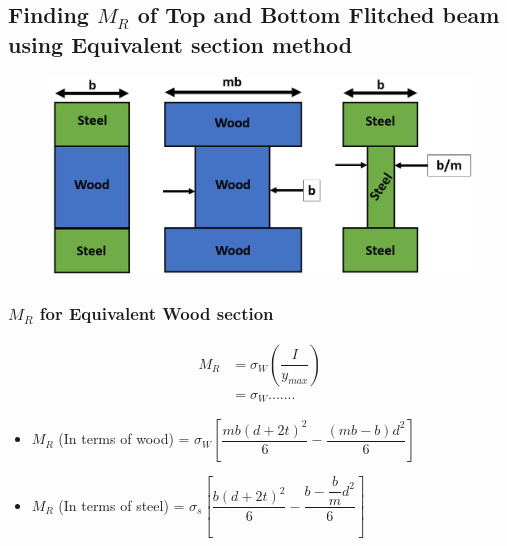 \documentclass[8pt]{report}
\begin{document}
	\subsection{Finding $M_R$ of Top and Bottom Flitched beam using Equivalent section method}
		\begin{figure}[H]
			\centering
			\includegraphics[scale=0.4]{flitchedbeam_MR.png}
		\end{figure}
		\subsubsection{$M_R$ for Equivalent Wood section}
			\begin{align*}
				M_{R} &= \sigma_W\left(\dfrac{I}{y_{max}}\right)\\
				&= \sigma_W.......
			\end{align*}
			\begin{itemize}
				\item $M_R$ (In terms of wood) = $\boxed{\sigma_W\left[\dfrac{mb(d+2t)^2}{6}-\dfrac{(mb-b)d^2}{6}\right]}$
				\item $M_R$ (In terms of steel) = $\boxed{\sigma_s\left[\dfrac{b(d+2t)^2}{6}-\dfrac{b-\dfrac{b}{m}d^2}{6}\right]}$
			\end{itemize}\hrulefill
\end{document}
